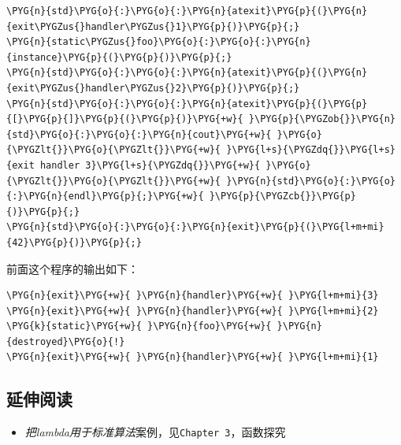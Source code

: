 \begin{codeblockbg}
\begin{Verbatim}[commandchars=\\\{\},breaklines=true,breakanywhere=true,fontsize=\codefont,xleftmargin=17bp]
\PYG{n}{std}\PYG{o}{:}\PYG{o}{:}\PYG{n}{atexit}\PYG{p}{(}\PYG{n}{exit\PYGZus{}handler\PYGZus{}1}\PYG{p}{)}\PYG{p}{;}
\PYG{n}{static\PYGZus{}foo}\PYG{o}{:}\PYG{o}{:}\PYG{n}{instance}\PYG{p}{(}\PYG{p}{)}\PYG{p}{;}
\PYG{n}{std}\PYG{o}{:}\PYG{o}{:}\PYG{n}{atexit}\PYG{p}{(}\PYG{n}{exit\PYGZus{}handler\PYGZus{}2}\PYG{p}{)}\PYG{p}{;}
\PYG{n}{std}\PYG{o}{:}\PYG{o}{:}\PYG{n}{atexit}\PYG{p}{(}\PYG{p}{[}\PYG{p}{]}\PYG{p}{(}\PYG{p}{)}\PYG{+w}{ }\PYG{p}{\PYGZob{}}\PYG{n}{std}\PYG{o}{:}\PYG{o}{:}\PYG{n}{cout}\PYG{+w}{ }\PYG{o}{\PYGZlt{}}\PYG{o}{\PYGZlt{}}\PYG{+w}{ }\PYG{l+s}{\PYGZdq{}}\PYG{l+s}{exit handler 3}\PYG{l+s}{\PYGZdq{}}\PYG{+w}{ }\PYG{o}{\PYGZlt{}}\PYG{o}{\PYGZlt{}}\PYG{+w}{ }\PYG{n}{std}\PYG{o}{:}\PYG{o}{:}\PYG{n}{endl}\PYG{p}{;}\PYG{+w}{ }\PYG{p}{\PYGZcb{}}\PYG{p}{)}\PYG{p}{;}
\PYG{n}{std}\PYG{o}{:}\PYG{o}{:}\PYG{n}{exit}\PYG{p}{(}\PYG{l+m+mi}{42}\PYG{p}{)}\PYG{p}{;}
\end{Verbatim}
\end{codeblockbg}



前面这个程序的输出如下：



\begin{codeblockbg}
\begin{Verbatim}[commandchars=\\\{\},breaklines=true,breakanywhere=true,fontsize=\codefont,xleftmargin=17bp]
\PYG{n}{exit}\PYG{+w}{ }\PYG{n}{handler}\PYG{+w}{ }\PYG{l+m+mi}{3}
\PYG{n}{exit}\PYG{+w}{ }\PYG{n}{handler}\PYG{+w}{ }\PYG{l+m+mi}{2}
\PYG{k}{static}\PYG{+w}{ }\PYG{n}{foo}\PYG{+w}{ }\PYG{n}{destroyed}\PYG{o}{!}
\PYG{n}{exit}\PYG{+w}{ }\PYG{n}{handler}\PYG{+w}{ }\PYG{l+m+mi}{1}
\end{Verbatim}
\end{codeblockbg}



\subsection{延伸阅读}



\begin{itemize}
\item \textit{把lambda用于标准算法}案例，见\texttt{Chapter 3}，函数探究

\end{itemize}


